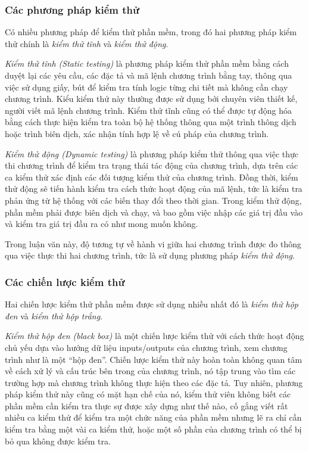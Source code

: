 \subsubsection{Các phương pháp kiểm thử}

Có nhiều phương pháp để kiểm thử phần mềm, trong đó hai phương pháp
kiểm thử chính là \emph{kiểm thử tĩnh} và \emph{kiểm thử động}.

\emph{Kiểm thử tĩnh (Static testing)} là phương pháp kiểm thử phần mềm
bằng cách duyệt lại các yêu cầu, các đặc tả và mã lệnh chương trình
bằng tay, thông qua việc sử dụng giấy, bút để kiểm tra tính logic từng
chi tiết mà không cần chạy chương trình. Kiểu kiểm thử này thường được
sử dụng bởi chuyên viên thiết kế, người viết mã lệnh chương
trình. Kiểm thử tĩnh cũng có thể được tự động hóa bằng cách thực hiện
kiểm tra toàn bộ hệ thống thông qua một trình thông dịch hoặc trình
biên dịch, xác nhận tính hợp lệ về cú pháp của chương trình.
		
\emph{Kiểm thử động (Dynamic testing)} là phương pháp kiểm thử thông
qua việc thực thi chương trình để kiểm tra trạng thái tác động của
chương trình, dựa trên các ca kiểm thử xác định các đối tượng kiểm thử
của chương trình. Đồng thời, kiểm thử động sẽ tiến hành kiểm tra cách
thức hoạt động của mã lệnh, tức là kiểm tra phản ứng từ hệ thống với
các biến thay đổi theo thời gian. Trong kiểm thử động, phần mềm phải
được biên dịch và chạy, và bao gồm việc nhập các giá trị đầu vào và
kiểm tra giá trị đầu ra có như mong muốn không.

Trong luận văn này, độ tương tự về hành vi giữa hai chương trình được
đo thông qua việc thực thi hai chương trình, tức là sử dụng phương
pháp \emph{kiểm thử động}.
	
\subsubsection{Các chiến lược kiểm thử}

Hai chiến lược kiểm thử phần mềm được sử dụng nhiều nhất đó là \emph{kiểm thử hộp đen} và \emph{kiểm thử hộp trắng}.
	
\emph{Kiểm thử hộp đen (black box)} là một chiến lược kiểm thử với
cách thức hoạt động chủ yếu dựa vào hướng dữ liệu inputs/outputs của
chương trình, xem chương trình như là một ``hộp đen''. Chiến lược kiểm
thử này hoàn toàn không quan tâm về cách xử lý và cấu trúc bên trong
của chương trình, nó tập trung vào tìm các trường hợp mà chương trình
không thực hiện theo các đặc tả. Tuy nhiên, phương pháp kiểm thử này
cũng có mặt hạn chế của nó, kiểm thử viên không biết các phần mềm cần
kiểm tra thực sự được xây dựng như thế nào, cố gắng viết rất nhiều ca
kiểm thử để kiểm tra một chức năng của phần mềm nhưng lẽ ra chỉ cần
kiểm tra bằng một vài ca kiểm thử, hoặc một số phần của chương trình
có thể bị bỏ qua không được kiểm tra.

